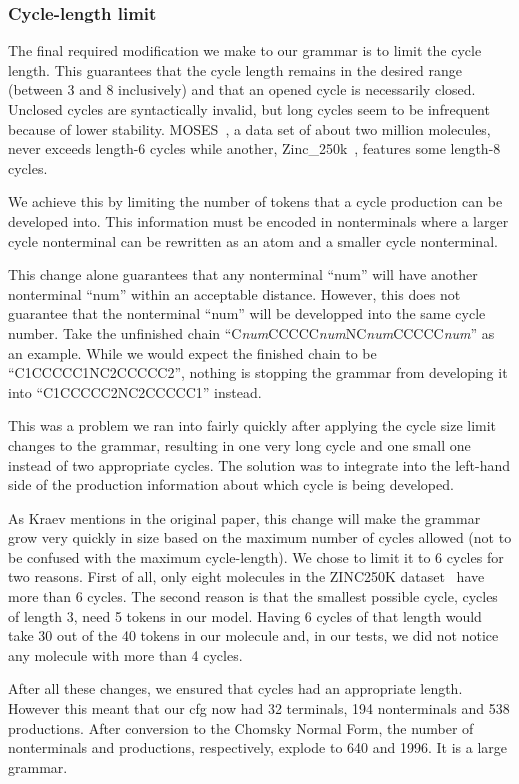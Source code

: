 \documentclass[../Document.tex]{subfiles}
\begin{document}
\subsubsection{Cycle-length limit}
The final required modification we make to our grammar is to limit the cycle length. This guarantees that the cycle length remains in the desired range (between 3 and 8 inclusively) and that an opened cycle is necessarily closed. Unclosed cycles are syntactically invalid, but long cycles seem to be infrequent because of lower stability.
MOSES~\cite{MOSES}, a data set of about two million molecules, never exceeds length-6 cycles while another, Zinc\_250k~\cite{Akhmetshin2021}, features some length-8 cycles. 

We achieve this by limiting the number of tokens that a cycle production can be developed into. This information must be encoded in nonterminals where a larger cycle nonterminal can be rewritten as an atom and a smaller cycle nonterminal.

This change alone guarantees that any nonterminal ``num'' will have another nonterminal ``num'' within an acceptable distance. However, this does not guarantee that the nonterminal ``num'' will be developped into the same cycle number. Take the unfinished chain ``C\textit{num}CCCCC\textit{num}NC\textit{num}CCCCC\textit{num}'' as an example. While we would expect the finished chain to be ``C1CCCCC1NC2CCCCC2'', nothing is stopping the grammar from developing it into ``C1CCCCC2NC2CCCCC1'' instead.

This was a problem we ran into fairly quickly after applying the cycle size limit changes to the grammar, resulting in one very long cycle and one small one instead of two appropriate cycles. The solution was to integrate into the left-hand side of the production information about which cycle is being developed.

As Kraev mentions in the original paper\cite{kraev2018grammars}, this change will make the grammar grow very quickly in size based on the maximum number of cycles allowed (not to be confused with the maximum cycle-length).
We chose to limit it to 6 cycles for two reasons. 
First of all, only eight molecules in the ZINC250K dataset~\cite{Akhmetshin2021} have more than 6 cycles. 
The second reason is that the smallest possible cycle, cycles of length 3, need 5 tokens in our model. Having 6 cycles of that length would take 30 out of the 40 tokens in our molecule and, in our tests, we did not notice any molecule with more than 4 cycles.

After all these changes, we ensured that cycles had an appropriate length. However this meant that our \gls{cfg} now had 32 terminals, 194 nonterminals and 538 productions. After conversion to the Chomsky Normal Form, the number of nonterminals and productions, respectively, explode to 640 and 1996.
It is a large grammar.

\end{document}
